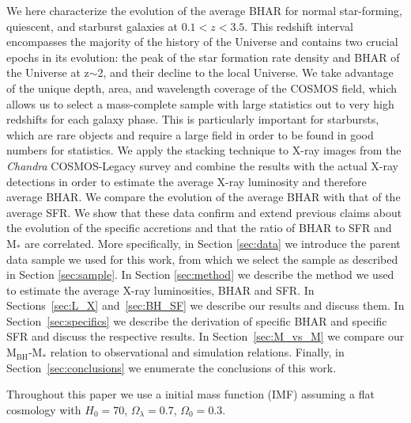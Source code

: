         We here characterize the evolution of the average BHAR for normal star-forming, quiescent, and starburst galaxies at $0.1<z<3.5$. This redshift interval encompasses the majority of the history of the Universe and contains two crucial epochs in its evolution: the peak of the star formation rate density and BHAR of the Universe at z$\sim$2, and their decline to the local Universe.
        We take advantage of the unique depth, area, and wavelength coverage of the COSMOS field, which allows us to select a mass-complete sample with large statistics out to very high redshifts for each galaxy phase. This is particularly important for starbursts, which are rare objects and require a large field in order to be found in good numbers for statistics. We apply the stacking technique to X-ray images from the \textit{Chandra} COSMOS-Legacy survey \citep{2016ApJ...819...62C} and combine the results with the actual X-ray detections in order to estimate the average X-ray luminosity and therefore average BHAR. We compare the evolution of the average BHAR with that of the average SFR. We show that these data confirm and extend previous claims about the evolution of the specific accretions and that the ratio of BHAR to SFR and M$_*$ are correlated. More specifically, in Section
 \ref{sec:data} we introduce the parent data sample we used for this work, from which we select the sample as described in Section \ref{sec:sample}. In Section \ref{sec:method} we describe the method we used to estimate the average X-ray luminosities, BHAR and SFR. In Sections~\ref{sec:L_X} and~\ref{sec:BH_SF} we describe our results and discuss them. In Section~\ref{sec:specifics} we describe the derivation of specific BHAR and specific SFR and discuss the respective results. In Section~\ref{sec:M_vs_M} we compare our M$_\text{BH}$-M$_*$ relation to observational and simulation relations. Finally, in Section~\ref{sec:conclusions} we enumerate the conclusions of this work.
   
Throughout this paper we use a \citet{2003PASP..115..763C} initial mass function (IMF) assuming a flat cosmology with $H_0=70$, $\Omega_\lambda=0.7$, $\Omega_0=0.3$.

